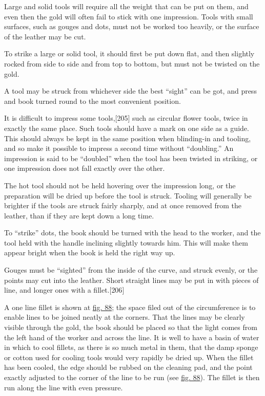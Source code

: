 \documentclass[
]{article}
\begin{document}
Large and solid tools will require all the weight that can be put on
them, and even then the gold will often fail to stick with one
impression. Tools with small surfaces, such as gouges and dots, must not
be worked too heavily, or the surface of the leather may be cut.

To strike a large or solid tool, it should first be put down flat, and
then slightly rocked from side to side and from top to bottom, but must
not be twisted on the gold.

A tool may be struck from whichever side the best ``sight'' can be got,
and press and book turned round to the most convenient position.

It is difficult to impress some
tools,{\protect\hypertarget{Page_205}{}{{[}205{]}}} such as circular
flower tools, twice in exactly the same place. Such tools should have a
mark on one side as a guide. This should always be kept in the same
position when blinding-in and tooling, and so make it possible to
impress a second time without ``doubling.'' An impression is said to be
``doubled'' when the tool has been twisted in striking, or one
impression does not fall exactly over the other.

The hot tool should not be held hovering over the impression long, or
the preparation will be dried up before the tool is struck. Tooling will
generally be brighter if the tools are struck fairly sharply, and at
once removed from the leather, than if they are kept down a long time.

To ``strike'' dots, the book should be turned with the head to the
worker, and the tool held with the handle inclining slightly towards
him. This will make them appear bright when the book is held the right
way up.

Gouges must be ``sighted'' from the inside of the curve, and struck
evenly, or the points may cut into the leather. Short straight lines may
be put in with pieces of line, and longer ones with a
fillet.{\protect\hypertarget{Page_206}{}{{[}206{]}}}

A one line fillet is shown at \protect\hyperlink{Fig_88}{fig. 88}; the
space filed out of the circumference is to enable lines to be joined
neatly at the corners. That the lines may be clearly visible through the
gold, the book should be placed so that the light comes from the left
hand of the worker and across the line. It is well to have a basin of
water in which to cool fillets, as there is so much metal in them, that
the damp sponge or cotton used for cooling tools would very rapidly be
dried up. When the fillet has been cooled, the edge should be rubbed on
the cleaning pad, and the point exactly adjusted to the corner of the
line to be run (see \protect\hyperlink{Fig_88}{fig. 88}). The fillet is
then run along the line with even pressure.
\end{document}
